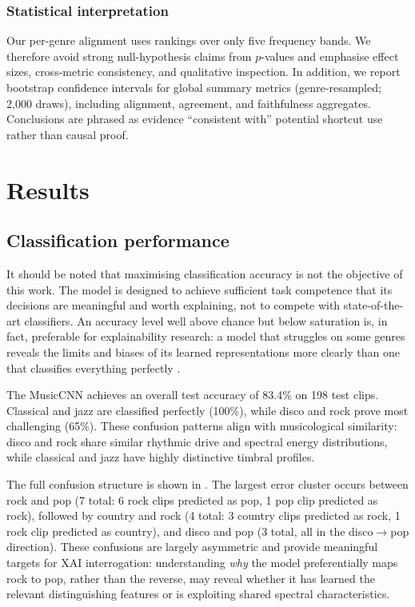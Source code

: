 \documentclass{article}
\begin{document}
\subsubsection{Statistical interpretation}

Our per-genre alignment uses rankings over only five frequency bands. We therefore avoid strong null-hypothesis claims from $p$-values and emphasise effect sizes, cross-metric consistency, and qualitative inspection. In addition, we report bootstrap confidence intervals for global summary metrics (genre-resampled; 2,000 draws), including alignment, agreement, and faithfulness aggregates. Conclusions are phrased as evidence ``consistent with'' potential shortcut use rather than causal proof.

\section{Results}\label{sec:results}

\subsection{Classification performance}\label{subsec:classification}

It should be noted that maximising classification accuracy is not the objective of this work. The model is designed to achieve sufficient task competence that its decisions are meaningful and worth explaining, not to compete with state-of-the-art classifiers. An accuracy level well above chance but below saturation is, in fact, preferable for explainability research: a model that struggles on some genres reveals the limits and biases of its learned representations more clearly than one that classifies everything perfectly \cite{Sturm2016}.

The MusicCNN achieves an overall test accuracy of 83.4\% on 198 test clips. Classical and jazz are classified perfectly (100\%), while disco and rock prove most challenging (65\%). These confusion patterns align with musicological similarity: disco and rock share similar rhythmic drive and spectral energy distributions, while classical and jazz have highly distinctive timbral profiles.

The full confusion structure is shown in . The largest error cluster occurs between rock and pop (7 total: 6 rock clips predicted as pop, 1 pop clip predicted as rock), followed by country and rock (4 total: 3 country clips predicted as rock, 1 rock clip predicted as country), and disco and pop (3 total, all in the disco$\rightarrow$pop direction). These confusions are largely asymmetric and provide meaningful targets for XAI interrogation: understanding \textit{why} the model preferentially maps rock to pop, rather than the reverse, may reveal whether it has learned the relevant distinguishing features or is exploiting shared spectral characteristics.
\end{document}
